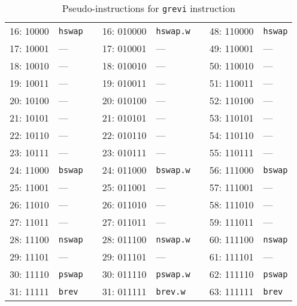 \begin{table}[h]
\begin{small}
\begin{center}
\begin{tabular}{r l p{0.5in} r l p{0.3in} r l}
\cline{1-2}
\cline{4-5}
\cline{7-8}

16: 10000 & {\tt hswap}   &   & 16: 010000 & {\tt hswap.w} &   & 48: 110000 & {\tt hswap} \\
17: 10001 & ---           &   & 17: 010001 & ---           &   & 49: 110001 & ---         \\
18: 10010 & ---           &   & 18: 010010 & ---           &   & 50: 110010 & ---         \\
19: 10011 & ---           &   & 19: 010011 & ---           &   & 51: 110011 & ---         \\
20: 10100 & ---           &   & 20: 010100 & ---           &   & 52: 110100 & ---         \\
21: 10101 & ---           &   & 21: 010101 & ---           &   & 53: 110101 & ---         \\
22: 10110 & ---           &   & 22: 010110 & ---           &   & 54: 110110 & ---         \\
23: 10111 & ---           &   & 23: 010111 & ---           &   & 55: 110111 & ---         \\

\cline{1-2}
\cline{4-5}
\cline{7-8}

24: 11000 & {\tt bswap}   &   & 24: 011000 & {\tt bswap.w} &   & 56: 111000 & {\tt bswap} \\
25: 11001 & ---           &   & 25: 011001 & ---           &   & 57: 111001 & ---         \\
26: 11010 & ---           &   & 26: 011010 & ---           &   & 58: 111010 & ---         \\
27: 11011 & ---           &   & 27: 011011 & ---           &   & 59: 111011 & ---         \\
28: 11100 & {\tt nswap}   &   & 28: 011100 & {\tt nswap.w} &   & 60: 111100 & {\tt nswap} \\
29: 11101 & ---           &   & 29: 011101 & ---           &   & 61: 111101 & ---         \\
30: 11110 & {\tt pswap}   &   & 30: 011110 & {\tt pswap.w} &   & 62: 111110 & {\tt pswap} \\
31: 11111 & {\tt brev}    &   & 31: 011111 & {\tt brev.w}  &   & 63: 111111 & {\tt brev}  \\
\end{tabular}
\end{center}
\end{small}
\caption{Pseudo-instructions for {\tt grevi} instruction}
\label{grevi-modes}
\end{table}

